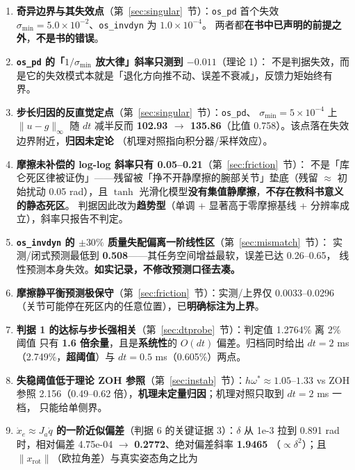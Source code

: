 \documentclass[11pt,a4paper]{ctexart}
\begin{document}
\begin{enumerate}[leftmargin=2em,itemsep=4pt]
\item \textbf{奇异边界与其失效点}（第~\ref{sec:singular}~节）：\texttt{os\_pd} 首个失效
  $\sigma_{\min}=5.0\times10^{-2}$、\texttt{os\_invdyn} 为 $1.0\times10^{-4}$。
  两者都\textbf{在书中已声明的前提之外}，\textbf{不是书的错误}。
\item \textbf{\texttt{os\_pd} 的「$1/\sigma_{\min}$ 放大律」斜率只测到 $-0.011$}（理论 1）：
  不是判据失效，而是它的失效模式本就是「退化方向推不动、误差不衰减」，反馈力矩始终有界。
\item \textbf{步长归因的反直觉定点}（第~\ref{sec:singular}~节）：\texttt{os\_pd}、
  $\sigma_{\min}=5\times10^{-4}$ 上 $\|u-g\|_\infty$ 随 $dt$ 减半反而
  \textbf{102.93 $\to$ 135.86}（比值 0.758）。该点落在失效边界附近，\textbf{归因未定论}
  （机理对照指向积分器/采样效应）。
\item \textbf{摩擦未补偿的 log-log 斜率只有 0.05--0.21}（第~\ref{sec:friction}~节）：
  不是「库仑死区律被证伪」——残留被「挣不开静摩擦的腕部关节」垫底（残留 $\approx$ 初始扰动
  0.05 rad），且 $\tanh$ 光滑化模型\textbf{没有集值静摩擦}，\textbf{不存在教科书意义的静态死区}。
  判据因此改为\textbf{趋势型}（单调 + 显著高于零摩擦基线 + 分辨率成立），斜率只报告不判定。
\item \textbf{\texttt{os\_invdyn} 的 $\pm30\%$ 质量失配偏离一阶线性区}（第~\ref{sec:mismatch}~节）：
  实测/闭式预测最低到 \textbf{0.508}——其任务空间增益最软，误差已达 0.26--0.65，
  线性预测本身失效。\textbf{如实记录，不修改预测口径去凑。}
\item \textbf{摩擦静平衡预测极保守}（第~\ref{sec:friction}~节）：实测/上界仅 0.0033--0.0296
  （关节可能停在死区内的任意位置），已\textbf{明确标注为上界}。
\item \textbf{判据 1 的达标与步长强相关}（第~\ref{sec:dtprobe}~节）：判定值 1.2764\% 离 2\% 阈值
  只有 \textbf{1.6 倍余量}，且是\textbf{系统性}的 $O(dt)$ 偏差。归档同时给出 $dt=2$ ms
  （2.749\%，\textbf{超阈值}）与 $dt=0.5$ ms（0.605\%）两点。
\item \textbf{失稳阈值低于理论 ZOH 参照}（第~\ref{sec:instab}~节）：$h\omega^*\approx1.05$--$1.33$
  vs ZOH 参照 2.156（0.49--0.62 倍），\textbf{机理未定量归因}；机理对照只取到 $dt=2$ ms 一档，
  只能给单侧界。
\item \textbf{$\dot x_e\approx J_a\dot q$ 的一阶近似偏差}（判据 6 的关键证据 3）：$\delta$ 从 1e-3
  拉到 0.891 rad 时，相对偏差 4.75e-04 $\to$ \textbf{0.2772}、绝对偏差斜率 \textbf{1.9465}
  （$\propto\delta^2$）；且 $\|x_{\mathrm{rot}}\|$（欧拉角差）与真实姿态角之比为

\end{enumerate}
\end{document}
